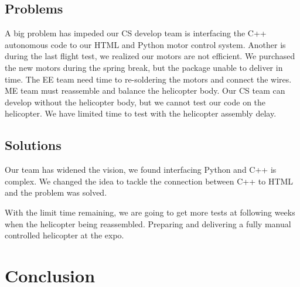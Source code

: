 \documentclass[onecolumn, draftclsnofoot,10pt, compsoc]{IEEEtran}
\begin{document}
\subsection{Problems}

A big problem has impeded our CS develop team is interfacing the C++ autonomous code to our HTML and Python motor control system. Another is during the last flight test, we realized our motors are not efficient. We purchased the new motors during the spring break, but the package unable to deliver in time. The EE team need time to re-soldering the motors and connect the wires. ME team must reassemble and balance the helicopter body. Our CS team can develop without the helicopter body, but we cannot test our code on the helicopter. We have limited time to test with the helicopter assembly delay.

\subsection{Solutions}

Our team has widened the vision, we found interfacing Python and C++ is complex. We changed the idea to tackle the connection between C++ to HTML and the problem was solved.

With the limit time remaining, we are going to get more tests at following weeks when the helicopter being reassembled. Preparing and delivering a fully manual controlled helicopter at the expo.

\section{Conclusion}






\end{document}
